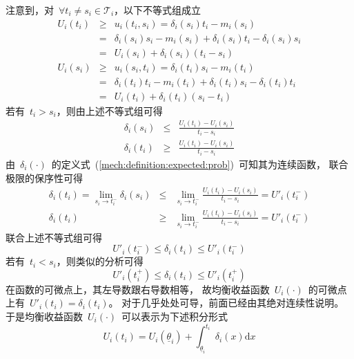 \documentclass[a4paper,12pt]{article}
\newcommand{\id}{\mathrm{d}}                      %
\begin{document}
注意到，对~$\forall t_i\neq s_i\in\mathcal{T}_i$，以下不等式组成立
\begin{eqnarray*}
  U_i(t_i) &\ge& u_i(t_i,s_i) = \delta_i(s_i)t_i - m_i(s_i) \\
   &=& \delta_i(s_i)s_i - m_i(s_i) + \delta_i(s_i)t_i - \delta_i(s_i)s_i\\
   &=& U_i(s_i) + \delta_i(s_i)(t_i - s_i)\\
  U_i(s_i) &\ge& u_i(s_i,t_i) = \delta_i(t_i)s_i - m_i(t_i) \\
   &=& \delta_i(t_i)t_i - m_i(t_i) + \delta_i(t_i)s_i - \delta_i(t_i)t_i\\
   &=& U_i(t_i) + \delta_i(t_i)(s_i - t_i)
\end{eqnarray*}
若有~$t_i>s_i$，则由上述不等式组可得
\begin{eqnarray*}
  \delta_i(s_i) &\le& \frac{U_i(t_i) - U_i(s_i)}{t_i - s_i} \\
  \delta_i(t_i) &\ge& \frac{U_i(t_i) - U_i(s_i)}{t_i - s_i}
\end{eqnarray*}
由~$\delta_i(\cdot)$~的定义式~(\ref{mech:definition:expected:prob})~可知其为连续函数，
联合极限的保序性可得
\begin{eqnarray*}
  \delta_i(t_i) = \lim_{s_i\rightarrow t_i^-}\delta_i(s_i)
              &\le& \lim_{s_i\rightarrow t_i^-}\frac{U_i(t_i) - U_i(s_i)}{t_i - s_i}
                = U'_i(t_i^-)\\
  \delta_i(t_i) &\ge& \lim_{s_i\rightarrow t_i^-}\frac{U_i(t_i) - U_i(s_i)}{t_i - s_i}
                  = U'_i(t_i^-)
\end{eqnarray*}
联合上述不等式组可得
\begin{equation*}
    U'_i(t_i^-) \le \delta_i(t_i) \le U'_i(t_i^-)
\end{equation*}
若有~$t_i<s_i$，则类似的分析可得
\begin{equation*}
    U'_i(t_i^+) \le \delta_i(t_i) \le U'_i(t_i^+)
\end{equation*}
在函数的可微点上，其左导数跟右导数相等，
故均衡收益函数~$U_i(\cdot)$~的可微点上有~$U'_i(t_i) = \delta_i(t_i)$。
对于几乎处处可导，前面已经由其绝对连续性说明。
于是均衡收益函数~$U_i(\cdot)$~可以表示为下述积分形式
\begin{equation}\label{mech:rep:epf}
    U_i(t_i) = U_i(\underline{\theta}_i) + \int_{\underline{\theta}_i}^{t_i}~\delta_i(x)\id x
\end{equation}
\end{document}
